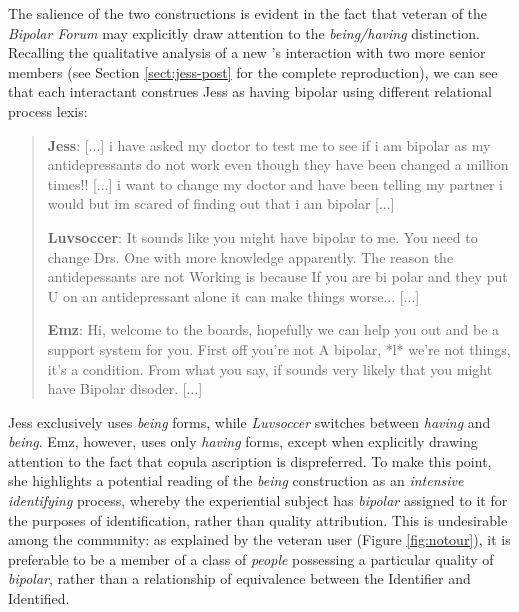 The salience of the two constructions is evident in the fact that veteran  of the \emph{Bipolar Forum} may explicitly draw attention to the \emph{being\slash having} distinction. Recalling the qualitative analysis of a new 's interaction with two more senior \glspl{member} (see Section \ref{sect:jess-post} for the complete reproduction), we can see that each interactant construes Jess as having \gls{bipolar} using different relational process lexis:

\begin{quotation}\small\singlespacing

\noindent \textbf{Jess}: [...] i have asked my doctor to test me to see if i am bipolar as my antidepressants do not work even though they have been changed a million times!! [...] i want to change my doctor and have been telling my partner i would but im scared of finding out that i am bipolar [...]

\noindent \textbf{Luvsoccer}: It sounds like you might have bipolar to me. You need to change Drs. One with more knowledge apparently. The reason the antidepessants are not Working is because If you are bi polar and they put U on an antidepressant alone it can make things worse... [...]

\noindent \textbf{Emz}: Hi, welcome to the boards, hopefully we can help you out and be a support system for you. First off you're not A bipolar, *l* we're not things, it's a condition. From what you say, if sounds very likely that you might have Bipolar disoder. [...]

\end{quotation}
%
Jess exclusively uses \emph{being} forms, while \emph{Luvsoccer} switches between \emph{having} and \emph{being}. Emz, however, uses only \emph{having} forms, except when explicitly drawing attention to the fact that copula ascription is dispreferred. To make this point, she highlights a potential reading of the \emph{being} construction as an \emph{intensive identifying} process, whereby the experiential subject has \emph{bipolar} assigned to it for the purposes of identification, rather than quality attribution. This is undesirable among the community: as explained by the veteran user (Figure \ref{fig:notour}), it is preferable to be a member of a class of \emph{people} possessing a particular quality of \emph{bipolar}, rather than a relationship of equivalence between the Identifier and Identified.

